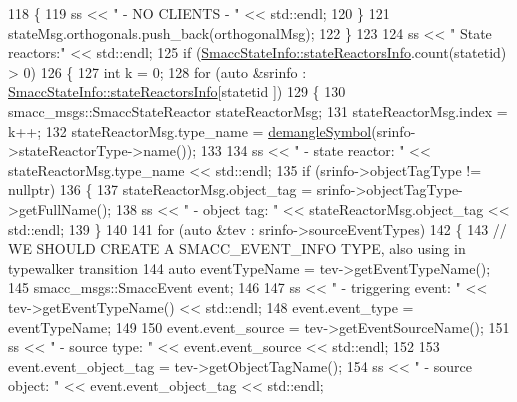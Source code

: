 \begin{DoxyCode}
118             \{
119                 ss << \textcolor{stringliteral}{"          - NO CLIENTS - "} << std::endl;
120             \}
121             stateMsg.orthogonals.push\_back(orthogonalMsg);
122         \}
123 
124         ss << \textcolor{stringliteral}{" State reactors:"} << std::endl;
125         \textcolor{keywordflow}{if} (\hyperlink{classsmacc_1_1introspection_1_1SmaccStateInfo_abd1d6ca5060c87f6bd11fde3e5b2ac4d}{SmaccStateInfo::stateReactorsInfo}.count(statetid) > 0)
126         \{
127             \textcolor{keywordtype}{int} k = 0;
128             \textcolor{keywordflow}{for} (\textcolor{keyword}{auto} &srinfo : \hyperlink{classsmacc_1_1introspection_1_1SmaccStateInfo_abd1d6ca5060c87f6bd11fde3e5b2ac4d}{SmaccStateInfo::stateReactorsInfo}[statetid
      ])
129             \{
130                 smacc\_msgs::SmaccStateReactor stateReactorMsg;
131                 stateReactorMsg.index = k++;
132                 stateReactorMsg.type\_name = \hyperlink{namespacesmacc_1_1introspection_a2f495108db3e57604d8d3ff5ef030302}{demangleSymbol}(srinfo->stateReactorType->name());
133 
134                 ss << \textcolor{stringliteral}{" - state reactor: "} << stateReactorMsg.type\_name << std::endl;
135                 \textcolor{keywordflow}{if} (srinfo->objectTagType != \textcolor{keyword}{nullptr})
136                 \{
137                     stateReactorMsg.object\_tag = srinfo->objectTagType->getFullName();
138                     ss << \textcolor{stringliteral}{"        - object tag: "} << stateReactorMsg.object\_tag << std::endl;
139                 \}
140 
141                 \textcolor{keywordflow}{for} (\textcolor{keyword}{auto} &tev : srinfo->sourceEventTypes)
142                 \{
143                     \textcolor{comment}{// WE SHOULD CREATE A SMACC\_EVENT\_INFO TYPE, also using in typewalker transition}
144                     \textcolor{keyword}{auto} eventTypeName = tev->getEventTypeName();
145                     smacc\_msgs::SmaccEvent event;
146 
147                     ss << \textcolor{stringliteral}{"             - triggering event: "} << tev->getEventTypeName() << std::endl;
148                     \textcolor{keyword}{event}.event\_type = eventTypeName;
149 
150                     \textcolor{keyword}{event}.event\_source = tev->getEventSourceName();
151                     ss << \textcolor{stringliteral}{"                 - source type: "} << \textcolor{keyword}{event}.event\_source << std::endl;
152 
153                     \textcolor{keyword}{event}.event\_object\_tag = tev->getObjectTagName();
154                     ss << \textcolor{stringliteral}{"                 - source object: "} << \textcolor{keyword}{event}.event\_object\_tag << std::endl;

\end{DoxyCode}
